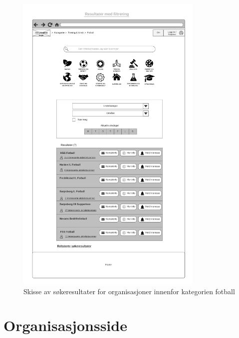 \begin{figure}[H]
\centering
\includegraphics[width=0.8\textwidth]{Illustrasjoner/Skisser/2.0/2-3-resultater-med-filtrering.png}
\caption{Skisse av søkeresultater for organisasjoner innenfor kategorien fotball}
\label{vedlegg:2-3-resultater-filt}
\end{figure}

\section{Organisasjonsside}

